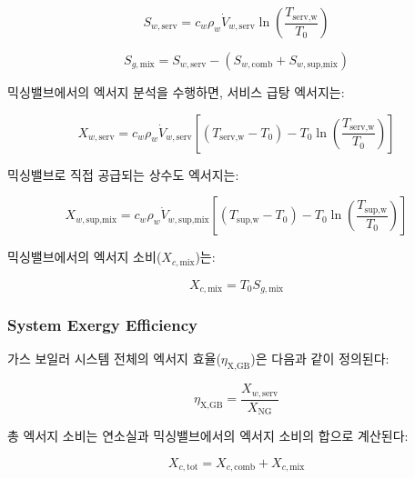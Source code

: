 \documentclass[final,5p,times,twocolumn,authoryear]{elsarticle}
\begin{document}
\begin{equation}
\label{eq:gb_s_w_serv}
S_{w,\text{serv}} = c_w \rho_w \dot{V}_{w,\text{serv}} \ln\left(\frac{T_{\text{serv,w}}}{T_0}\right)
\end{equation}

\begin{equation}
\label{eq:gb_sg_mix}
S_{g,\text{mix}} = S_{w,\text{serv}} - (S_{w,\text{comb}} + S_{w,\text{sup,mix}})
\end{equation}

믹싱밸브에서의 엑서지 분석을 수행하면, 서비스 급탕 엑서지는:

\begin{equation}
\label{eq:gb_x_w_serv}
X_{w,\text{serv}} = c_w \rho_w \dot{V}_{w,\text{serv}} \left[(T_{\text{serv,w}} - T_0) - T_0 \ln\left(\frac{T_{\text{serv,w}}}{T_0}\right)\right]
\end{equation}

믹싱밸브로 직접 공급되는 상수도 엑서지는:

\begin{equation}
\label{eq:gb_x_w_sup_mix}
X_{w,\text{sup,mix}} = c_w \rho_w \dot{V}_{w,\text{sup,mix}} \left[(T_{\text{sup,w}} - T_0) - T_0 \ln\left(\frac{T_{\text{sup,w}}}{T_0}\right)\right]
\end{equation}

믹싱밸브에서의 엑서지 소비($X_{c,\text{mix}}$)는:

\begin{equation}
\label{eq:gb_xc_mix}
X_{c,\text{mix}} = T_0 S_{g,\text{mix}}
\end{equation}

\subsubsection{System Exergy Efficiency}

가스 보일러 시스템 전체의 엑서지 효율($\eta_{\text{X,GB}}$)은 다음과 같이 정의된다:

\begin{equation}
\label{eq:gb_exergy_efficiency}
\eta_{\text{X,GB}} = \frac{X_{w,\text{serv}}}{X_{\text{NG}}}
\end{equation}

총 엑서지 소비는 연소실과 믹싱밸브에서의 엑서지 소비의 합으로 계산된다:

\begin{equation}
\label{eq:gb_xc_tot}
X_{c,\text{tot}} = X_{c,\text{comb}} + X_{c,\text{mix}}
\end{equation}
\end{document}
